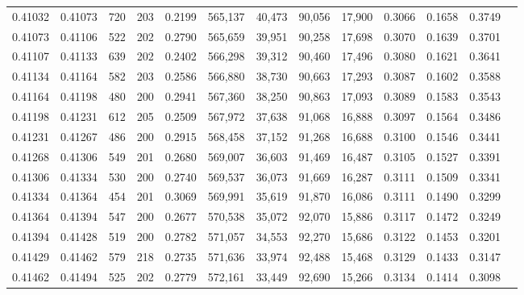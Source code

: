 \begin{tabular}{rrrrrrrrrrrrr}
0.41032 & 0.41073 &   720 & 203 &                                     0.2199 & 565,137 &  40,473 &  90,056 &  17,900 & 0.3066 & 0.1658 & 0.3749 \\
0.41073 & 0.41106 &   522 & 202 &                                     0.2790 & 565,659 &  39,951 &  90,258 &  17,698 & 0.3070 & 0.1639 & 0.3701 \\
0.41107 & 0.41133 &   639 & 202 &                                     0.2402 & 566,298 &  39,312 &  90,460 &  17,496 & 0.3080 & 0.1621 & 0.3641 \\
0.41134 & 0.41164 &   582 & 203 &                                     0.2586 & 566,880 &  38,730 &  90,663 &  17,293 & 0.3087 & 0.1602 & 0.3588 \\
0.41164 & 0.41198 &   480 & 200 &                                     0.2941 & 567,360 &  38,250 &  90,863 &  17,093 & 0.3089 & 0.1583 & 0.3543 \\
0.41198 & 0.41231 &   612 & 205 &                                     0.2509 & 567,972 &  37,638 &  91,068 &  16,888 & 0.3097 & 0.1564 & 0.3486 \\
0.41231 & 0.41267 &   486 & 200 &                                     0.2915 & 568,458 &  37,152 &  91,268 &  16,688 & 0.3100 & 0.1546 & 0.3441 \\
0.41268 & 0.41306 &   549 & 201 &                                     0.2680 & 569,007 &  36,603 &  91,469 &  16,487 & 0.3105 & 0.1527 & 0.3391 \\
0.41306 & 0.41334 &   530 & 200 &                                     0.2740 & 569,537 &  36,073 &  91,669 &  16,287 & 0.3111 & 0.1509 & 0.3341 \\
0.41334 & 0.41364 &   454 & 201 &                                     0.3069 & 569,991 &  35,619 &  91,870 &  16,086 & 0.3111 & 0.1490 & 0.3299 \\
0.41364 & 0.41394 &   547 & 200 &                                     0.2677 & 570,538 &  35,072 &  92,070 &  15,886 & 0.3117 & 0.1472 & 0.3249 \\
0.41394 & 0.41428 &   519 & 200 &                                     0.2782 & 571,057 &  34,553 &  92,270 &  15,686 & 0.3122 & 0.1453 & 0.3201 \\
0.41429 & 0.41462 &   579 & 218 &                                     0.2735 & 571,636 &  33,974 &  92,488 &  15,468 & 0.3129 & 0.1433 & 0.3147 \\
0.41462 & 0.41494 &   525 & 202 &                                     0.2779 & 572,161 &  33,449 &  92,690 &  15,266 & 0.3134 & 0.1414 & 0.3098 \\

\end{tabular}
